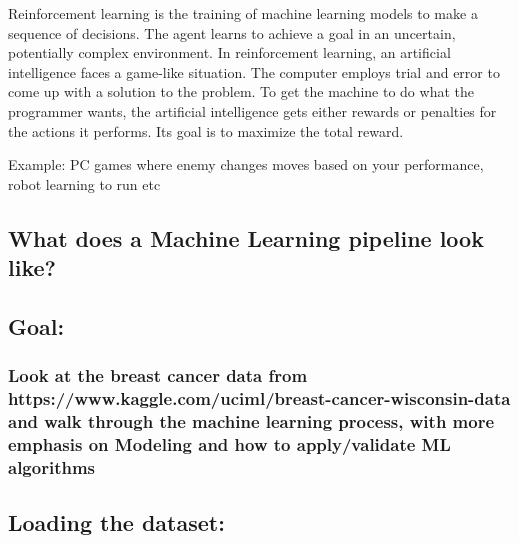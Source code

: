 \documentclass[11pt]{article}
\begin{document}
    Reinforcement learning is the training of machine learning models to
make a sequence of decisions. The agent learns to achieve a goal in an
uncertain, potentially complex environment. In reinforcement learning,
an artificial intelligence faces a game-like situation. The computer
employs trial and error to come up with a solution to the problem. To
get the machine to do what the programmer wants, the artificial
intelligence gets either rewards or penalties for the actions it
performs. Its goal is to maximize the total reward.

    Example: PC games where enemy changes moves based on your performance,
robot learning to run etc

    

    \hypertarget{what-does-a-machine-learning-pipeline-look-like}{%
\subsection{What does a Machine Learning pipeline look
like?}\label{what-does-a-machine-learning-pipeline-look-like}}

    

    

    \hypertarget{goal}{%
\subsection{Goal:}\label{goal}}

\hypertarget{look-at-the-breast-cancer-data-from-httpswww.kaggle.comucimlbreast-cancer-wisconsin-data-and-walk-through-the-machine-learning-process-with-more-emphasis-on-modeling-and-how-to-applyvalidate-ml-algorithms}{%
\subsubsection{Look at the breast cancer data from
https://www.kaggle.com/uciml/breast-cancer-wisconsin-data and walk
through the machine learning process, with more emphasis on Modeling and
how to apply/validate ML
algorithms}\label{look-at-the-breast-cancer-data-from-httpswww.kaggle.comucimlbreast-cancer-wisconsin-data-and-walk-through-the-machine-learning-process-with-more-emphasis-on-modeling-and-how-to-applyvalidate-ml-algorithms}}

    

    \hypertarget{loading-the-dataset}{%
\subsection{Loading the dataset:}\label{loading-the-dataset}}
\end{document}
